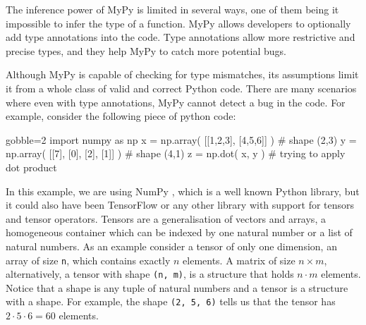 
The inference power of MyPy is limited in several ways, one of them being it impossible to
infer the type of a function. MyPy allows developers to optionally add type annotations
into the code. Type annotations allow more restrictive and precise types, and they help
MyPy to catch more potential bugs.

Although MyPy is capable of checking for type mismatches, its assumptions limit it
from a whole class of valid and correct Python code\footnotemark. There are many scenarios
where even with type annotations, MyPy cannot detect a bug in the code. For example,
consider the following piece of python code:%



\begin{pythoncode*}{gobble=2}
  import numpy as np
  x = np.array( [[1,2,3], [4,5,6]] ) # shape (2,3)
  y = np.array( [[7], [0], [2], [1]] ) # shape (4,1)
  z = np.dot( x, y ) # trying to apply dot product
\end{pythoncode*}

In this example, we are using NumPy \autocite{oliphant2006guide}, which is a well known
Python library, but it could also have been TensorFlow \autocite{abadi_tensorflow_2016} or
any other library with support for tensors and tensor operators. Tensors are a
generalisation of vectors and arrays, a homogeneous container which can be indexed by one
natural number or a list of natural numbers. As an example consider a tensor of only one
dimension, an array of size \texttt{n}, which contains exactly \(n\) elements. A matrix of
size \(n \times m\), alternatively, a tensor with shape \texttt{(n,\ m)}, is a structure
that holds \(n \cdot m\) elements. Notice that a shape is any tuple of natural numbers and
a tensor is a structure with a shape. For example, the shape \texttt{(2,\ 5,\ 6)}
tells us that the tensor has \(2 \cdot 5 \cdot 6 = 60\) elements.

